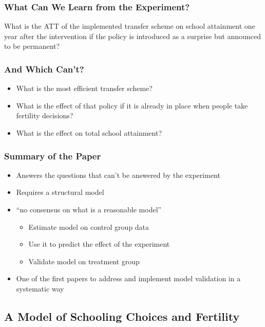 \documentclass[11pt]{beamer}
\begin{document}
\begin{frame}[c]\frametitle{What Can We Learn from the Experiment?}
\pause
What is the ATT of the implemented transfer scheme on school attainment \pause one year after the intervention \pause if the policy is introduced as a surprise  \pause but announced to be permanent?
\end{frame}


\begin{frame}[c]\frametitle{And Which Can't?}
\begin{itemize}
    \item What is the most \alert{efficient transfer scheme}?
    \item What is the effect of that policy if it is already \alert{in place when people take fertility decisions}?
    \item What is the effect on \alert{total school attainment}?
\end{itemize}
\end{frame}


\begin{frame}[c]\frametitle{Summary of the Paper}
\begin{itemize}
    \item Answers the questions that can't be answered by the experiment
    \item Requires a structural model
    \item ``no consensus on what is a reasonable model''
    \begin{itemize}
        \item Estimate model on control group data
        \item Use it to predict the effect of the experiment
        \item Validate model on treatment group
    \end{itemize}
    \item One of the first papers to address and implement model validation in a systematic way
\end{itemize}
\end{frame}


\subsection{A Model of Schooling Choices and Fertility}
\end{document}
